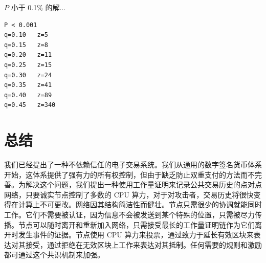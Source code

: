 \documentclass{article}
\begin{document}
$P$ 小于 0.1\% 的解...

\begin{lstlisting}
P < 0.001
q=0.10   z=5
q=0.15   z=8
q=0.20   z=11
q=0.25   z=15
q=0.30   z=24
q=0.35   z=41
q=0.40   z=89
q=0.45   z=340
\end{lstlisting}

\section{总结}

我们已经提出了一种不依赖信任的电子交易系统。我们从通用的数字签名货币体系开始，这体系提供了强有力的所有权控制，但由于缺乏防止双重支付的方法而不完善。为解决这个问题，我们提出一种使用工作量证明来记录公共交易历史的点对点网络，只要诚实节点控制了多数的 CPU 算力，对于对攻击者，交易历史将很快变得在计算上不可更改。网络因其结构简洁性而健壮。节点只需很少的协调就能同时工作。它们不需要被认证，因为信息不会被发送到某个特殊的位置，只需被尽力传播。节点可以随时离开和重新加入网络，只需接受最长的工作量证明链作为它们离开时发生事件的证据。节点使用 CPU 算力来投票，通过致力于延长有效区块来表达对其接受，通过拒绝在无效区块上工作来表达对其抵制。任何需要的规则和激励都可通过这个共识机制来加强。


\end{document}
